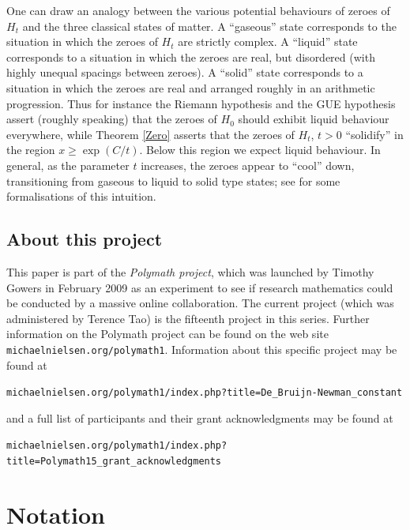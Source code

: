 \begin{remark}  One can draw an analogy between the various potential behaviours of zeroes of $H_t$ and the three classical states of matter.  A ``gaseous'' state corresponds to the situation in which the zeroes of $H_t$ are strictly complex.  A ``liquid'' state corresponds to a situation in which the zeroes are real, but disordered (with highly unequal spacings between zeroes).  A ``solid'' state corresponds to a situation in which the zeroes are real and arranged roughly in an arithmetic progression.  Thus for instance the Riemann hypothesis and the GUE hypothesis assert (roughly speaking) that the zeroes of $H_0$ should exhibit liquid behaviour everywhere, while Theorem \ref{Zero} asserts that the zeroes of $H_t$, $t>0$ ``solidify'' in the region $x \geq \exp(C/t)$.  Below this region we expect liquid behaviour.  In general, as the parameter $t$ increases, the zeroes appear to ``cool'' down, transitioning from gaseous to liquid to solid type states; see \cite{brad} for some formalisations of this intuition.
\end{remark}

\subsection{About this project}

This paper is part of the \emph{Polymath project}, which was launched
by Timothy Gowers in February 2009 as an experiment to see if research
mathematics could be conducted by a massive online collaboration.
The current project (which was administered by Terence Tao) is the fifteenth
project in this series.  Further information on the Polymath project can be
found on the web site {\tt michaelnielsen.org/polymath1}.  Information
about this specific project may be found at
\begin{center}
\small{{\tt michaelnielsen.org/polymath1/index.php?title=De\_Bruijn-Newman\_constant}}
\end{center}
and a full list of participants and their grant acknowledgments may be
found at
\begin{center}
\small{{\tt michaelnielsen.org/polymath1/index.php?title=Polymath15\_grant\_acknowledgments}}
\end{center}

\section{Notation}

